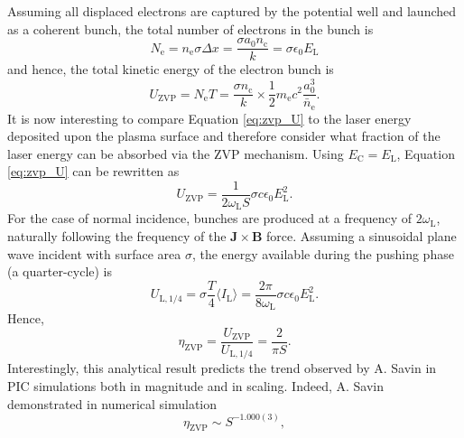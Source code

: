 Assuming all displaced electrons are captured by the potential well and launched as a coherent bunch, the total number of electrons in the bunch is
\begin{equation}\label{eq:zvp-Ne}
	N_\mathrm{e} = n_\mathrm{e} \sigma \Delta x = \frac{\sigma a_0 n_\mathrm{c}}{k}  = \sigma \epsilon_0 E_\mathrm{L}
\end{equation}
and hence, the total kinetic energy of the electron bunch is
\begin{equation}\label{eq:zvp_U}
	U_\mathrm{ZVP} = N_\mathrm{e} T = \frac{\sigma n_\mathrm{c}}{k}\times \frac{1}{2}m_\mathrm{e}c^2 \frac{a^3_0}{\bar{n}_\mathrm{e}}.
\end{equation}
It is now interesting to compare Equation \ref{eq:zvp_U} to the laser energy deposited upon the plasma surface and therefore consider what fraction of the laser energy can be absorbed via the \ac{ZVP} mechanism. Using $E_\mathrm{C} = E_\mathrm{L}$, Equation \ref{eq:zvp_U} can be rewritten as
\begin{equation}
	U_\mathrm{ZVP} = \frac{1}{2\omega_\mathrm{L} S}\sigma c \epsilon_0 E^2_\mathrm{L}.
\end{equation}
For the case of normal incidence, bunches are produced at a frequency of $2\omega_\mathrm{L}$, naturally following the frequency of the $\mathbf{J}\times \mathbf{B}$ force. Assuming a sinusoidal plane wave incident with surface area $\sigma$, the energy available during the pushing phase (a quarter-cycle) is
\begin{equation}
	 U_\mathrm{L,1/4} = \sigma \frac{T}{4}\langle I_\mathrm{L}\rangle = \frac{2\pi}{8\omega_\mathrm{L}}\sigma c\epsilon_0E^2_\mathrm{L}.
\end{equation}
Hence,
\begin{equation}
	\eta_\mathrm{ZVP} = \frac{U_\mathrm{ZVP}}{U_\mathrm{L,1/4}} = \frac{2}{\pi S}.
\end{equation}
Interestingly, this analytical result predicts the trend observed by A. Savin \cite{savinModellingLaserPlasmaInteractions2019} in \ac{PIC} simulations both in magnitude and in scaling. Indeed, A. Savin demonstrated in numerical simulation
\begin{equation}
	\eta_\mathrm{ZVP} \sim S^{-1.000(3)},
\end{equation}
